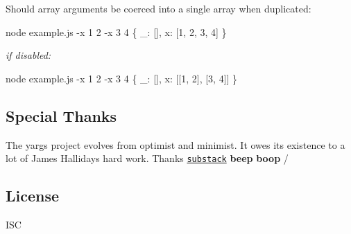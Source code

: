 Should array arguments be coerced into a single array when duplicated\+:


\begin{DoxyCode}
node example.js -x 1 2 -x 3 4
\{ \_: [], x: [1, 2, 3, 4] \}
\end{DoxyCode}


{\itshape if disabled\+:}


\begin{DoxyCode}
node example.js -x 1 2 -x 3 4
\{ \_: [], x: [[1, 2], [3, 4]] \}
\end{DoxyCode}


\subsection*{Special Thanks}

The yargs project evolves from optimist and minimist. It owes its existence to a lot of James Halliday\textquotesingle{}s hard work. Thanks \href{https://github.com/substack}{\tt substack} {\bfseries beep} {\bfseries boop} /

\subsection*{License}

I\+SC 